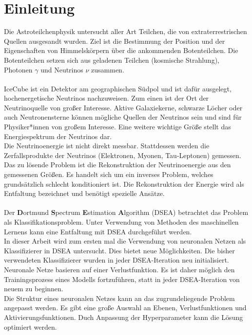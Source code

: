 \chapter{Einleitung}
Die Astroteilchenphysik untersucht aller Art Teilchen, die von extraterrestrischen Quellen ausgesandt wurden.
Ziel ist die Bestimmung der Position und der Eigenschaften von Himmelskörpern über die ankommenden Botenteilchen.
Die Botenteilchen setzen sich aus geladenen Teilchen (kosmische Strahlung), Photonen $\gamma$ und Neutrinos $\nu$ zusammen.\cite{icecube_detector}
\\
\\
IceCube ist ein Detektor am geographischen Südpol und ist dafür ausgelegt, hochenergetische Neutrinos nachzuweisen.
Zum einen ist der Ort der Neutrinoquelle von großer Interesse.
Aktive Galaxiekerne, schwarze Löcher oder auch Neutronensterne können mögliche Quellen der Neutrinos sein und sind für Physiker*innen von großem Interesse.
Eine weitere wichtige Größe stellt das Energiespektrum der Neutrinos dar.
\\
Die Neutrinoenergie ist nicht direkt messbar.
Stattdessen werden die Zerfallsprodukte der Neutrinos (Elektronen, Myonen, Tau-Leptonen) gemessen.
Das zu lösende Problem ist die Rekonstruktion der Neutrinoenergie aus den gemessenen Größen.
Es handelt sich um ein inverses Problem, welches grundsätzlich schlecht konditioniert ist.
Die Rekonstruktion der Energie wird als Entfaltung bezeichnet und benötigt spezielle Ansätze.
\\
\\
Der \textbf{D}ortmund \textbf{S}pectrum \textbf{E}stimation \textbf{A}lgorithm (DSEA) \cite{ruhe} betrachtet das Problem als Klassifikationsproblem.
Unter Verwendung von Methoden des maschinellen Lernens kann eine Entfaltung mit DSEA durchgeführt werden.
\\
In dieser Arbeit wird zum ersten mal die Verwendung von neuronalen Netzen als Klassifizierer in DSEA untersucht.
Dies bietet neue Möglichkeiten.
Die bisher verwendeten Klassifizierer wurden in jeder DSEA-Iteration neu initialisiert.
Neuronale Netze basieren auf einer Verlustfunktion.
Es ist daher möglich den Trainingsprozess eines Modells fortzuführen, statt in jeder DSEA-Iteration von neuem zu beginnen.
\\
Die Struktur eines neuronalen Netzes kann an das zugrundeliegende Problem angepasst werden.
Es gibt eine große Auswahl an Ebenen, Verlustfunktionen und Aktivierungsfunktionen.
Duch Anpassung der Hyperparameter kann die Lösung optimiert werden.